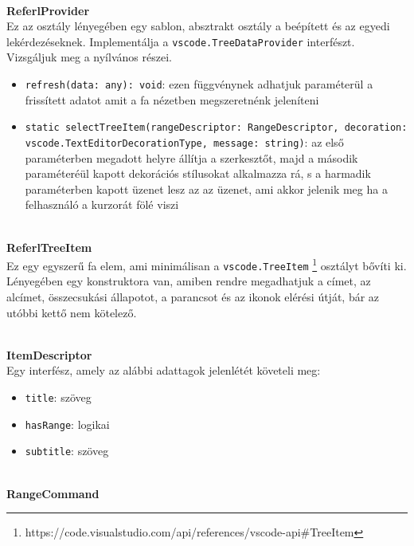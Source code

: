 \\
\vspace{14pt}
\textbf{ReferlProvider}
\\

Ez az osztály lényegében egy sablon, absztrakt osztály a beépített és az egyedi lekérdezéseknek. Implementálja a \lstinline{vscode.TreeDataProvider} interfészt. Vizsgáljuk meg a nyílvános részei.

\begin{itemize}
    \item \lstinline{refresh(data: any): void}: ezen függvénynek adhatjuk paraméterül a frissített adatot amit a fa nézetben megszeretnénk jeleníteni
    
    \item \lstinline{static selectTreeItem(rangeDescriptor: RangeDescriptor, decoration: vscode.TextEditorDecorationType, message: string)}: az első paraméterben megadott helyre állítja a szerkesztőt, majd a második paraméteréül kapott dekorációs stílusokat alkalmazza rá, s a harmadik paraméterben kapott üzenet lesz az az üzenet, ami akkor jelenik meg ha a felhasználó a kurzorát fölé viszi
\end{itemize}

\\
\vspace{14pt}
\textbf{ReferlTreeItem}
\\

Ez egy egyszerű fa elem, ami minimálisan a \lstinline{vscode.TreeItem} \footnote{https://code.visualstudio.com/api/references/vscode-api#TreeItem} osztályt bővíti ki. Lényegében egy konstruktora van, amiben rendre megadhatjuk a címet, az alcímet, összecsukási állapotot, a parancsot és az ikonok elérési útját, bár az utóbbi kettő nem kötelező.


\\
\vspace{14pt}
\textbf{ItemDescriptor}
\\

Egy interfész, amely az alábbi adattagok jelenlétét követeli meg:
\begin{itemize}
    \item \lstinline{title}: szöveg
    \item \lstinline{hasRange}: logikai
    \item \lstinline{subtitle}: szöveg
\end{itemize}


\\
\vspace{14pt}
\textbf{RangeCommand}
\\


